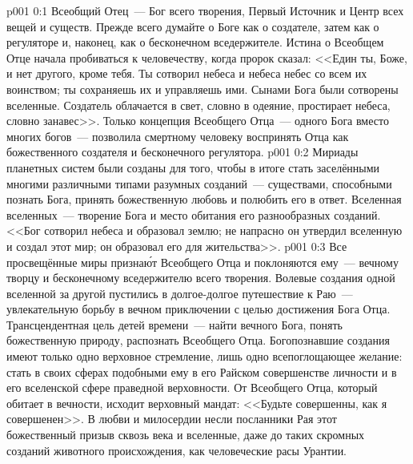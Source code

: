 \author{Божественный Советник}
\vs p001 0:1 Всеобщий Отец~--- Бог всего творения, Первый Источник и Центр всех вещей и существ. Прежде всего думайте о Боге как о создателе, затем как о регуляторе и, наконец, как о бесконечном вседержителе. Истина о Всеобщем Отце начала пробиваться к человечеству, когда пророк сказал: <<Един ты, Боже, и нет другого, кроме тебя. Ты сотворил небеса и небеса небес со всем их воинством; ты сохраняешь их и управляешь ими. Сынами Бога были сотворены вселенные. Создатель облачается в свет, словно в одеяние, простирает небеса, словно занавес>>. Только концепция Всеобщего Отца~--- одного Бога вместо многих богов~--- позволила смертному человеку воспринять Отца как божественного создателя и бесконечного регулятора.
\vs p001 0:2 Мириады планетных систем были созданы для того, чтобы в итоге стать заселёнными многими различными типами разумных созданий~--- существами, способными познать Бога, принять божественную любовь и полюбить его в ответ. Вселенная вселенных~--- творение Бога и место обитания его разнообразных созданий. <<Бог сотворил небеса и образовал землю; не напрасно он утвердил вселенную и создал этот мир; он образовал его для жительства>>.
\vs p001 0:3 Все просвещённые миры призна\'ют Всеобщего Отца и поклоняются ему~--- вечному творцу и бесконечному вседержителю всего творения. Волевые создания одной вселенной за другой пустились в долгое\hyp{}долгое путешествие к Раю~--- увлекательную борьбу в вечном приключении с целью достижения Бога Отца. Трансцендентная цель детей времени~--- найти вечного Бога, понять божественную природу, распознать Всеобщего Отца. Богопознавшие создания имеют только одно верховное стремление, лишь одно всепоглощающее желание: стать в своих сферах подобными ему в его Райском совершенстве личности и в его вселенской сфере праведной верховности. От Всеобщего Отца, который обитает в вечности, исходит верховный мандат: <<Будьте совершенны, как я совершенен>>. В любви и милосердии несли посланники Рая этот божественный призыв сквозь века и вселенные, даже до таких скромных созданий животного происхождения, как человеческие расы Урантии.
